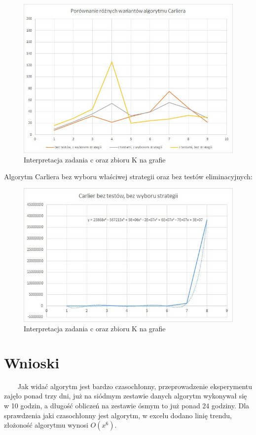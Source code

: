 \documentclass[11pt]{article}
\begin{document}
\begin{figure}[!h]
\centering
\includegraphics[scale=0.51]{Wykres_1}
\caption{Interpretacja zadania c oraz zbioru K na grafie}
\end{figure}

 Algorytm Carliera bez wyboru właściwej strategii oraz bez testów eliminacyjnych:

\begin{figure}[!h]
\centering
\includegraphics[scale=0.53]{wykres_2}
\caption{Interpretacja zadania c oraz zbioru K na grafie}
\end{figure}

\newpage
\section{Wnioski} 
~~~~Jak widać algorytm jest bardzo czasochłonny, przeprowadzenie eksperymentu zajęło ponad trzy dni, już na siódmym zestawie danych algorytm wykonywał się w 10 godzin, a długość obliczeń na zestawie ósmym to już ponad 24 godziny. Dla sprawdzenia jaki czasochłonny jest algorytm, w excelu dodano linię trendu, złożoność algorytmu wynosi $O(x^6)$.
\end{document}
